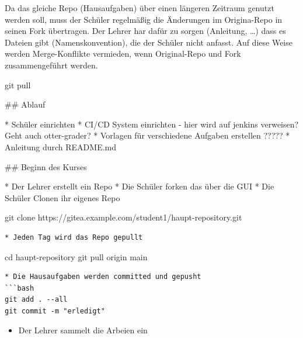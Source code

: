 \documentclass[
  letterpaper,
  DIV=11]{scrreprt}
\newenvironment{Shaded}{\begin{snugshade}}{\end{snugshade}}
\newcommand{\AttributeTok}[1]{\textcolor[rgb]{0.40,0.45,0.13}{#1}}
\newcommand{\CommentTok}[1]{\textcolor[rgb]{0.37,0.37,0.37}{#1}}
\newcommand{\ExtensionTok}[1]{\textcolor[rgb]{0.00,0.23,0.31}{#1}}
\newcommand{\FunctionTok}[1]{\textcolor[rgb]{0.28,0.35,0.67}{#1}}
\newcommand{\NormalTok}[1]{\textcolor[rgb]{0.00,0.23,0.31}{#1}}
\newcommand{\PreprocessorTok}[1]{\textcolor[rgb]{0.68,0.00,0.00}{#1}}
\providecommand{\tightlist}{%
  \setlength{\itemsep}{0pt}\setlength{\parskip}{0pt}}\usepackage{longtable,booktabs,array}
\begin{document}
Da das gleiche Repo (Hausaufgaben) über einen längeren Zeitraum genutzt
werden soll, muss der Schüler regelmäßig die Änderungen im Origina-Repo
in seinen Fork übertragen. Der Lehrer har dafür zu sorgen (Anleitung,
\ldots) dass es Dateien gibt (Namenskonvention), die der Schüler nicht
anfasst. Auf diese Weise werden Merge-Konflikte vermieden, wenn
Original-Repo und Fork zusammengeführt werden.

\begin{Shaded}
\begin{Highlighting}[]
\FunctionTok{git}\NormalTok{ pull }


\CommentTok{\#\# Ablauf}

\ExtensionTok{*}\NormalTok{ Schüler einrichten}
\ExtensionTok{*}\NormalTok{ CI/CD System einrichten }\AttributeTok{{-}}\NormalTok{ hier wird auf jenkins verweisen}\PreprocessorTok{?}\NormalTok{ Geht auch otter{-}grader}\PreprocessorTok{?}
\ExtensionTok{*}\NormalTok{ Vorlagen für verschiedene Aufgaben erstellen }\PreprocessorTok{?????}
\ExtensionTok{*}\NormalTok{ Anleitung durch README.md}


\CommentTok{\#\# Beginn des Kurses}

\ExtensionTok{*}\NormalTok{ Der Lehrer erstellt ein Repo}
\ExtensionTok{*}\NormalTok{ Die Schüler forken das über die GUI}
\ExtensionTok{*}\NormalTok{ Die Schüler Clonen ihr eigenes Repo}
\end{Highlighting}
\end{Shaded}

git clone https://gitea.example.com/student1/haupt-repository.git

\begin{verbatim}
* Jeden Tag wird das Repo gepullt
\end{verbatim}

cd haupt-repository git pull origin main

\begin{verbatim}
* Die Hausaufgaben werden committed und gepusht
```bash
git add . --all
git commit -m "erledigt"
\end{verbatim}

\begin{itemize}
\tightlist
\item
  Der Lehrer sammelt die Arbeien ein
\end{itemize}
\end{document}

